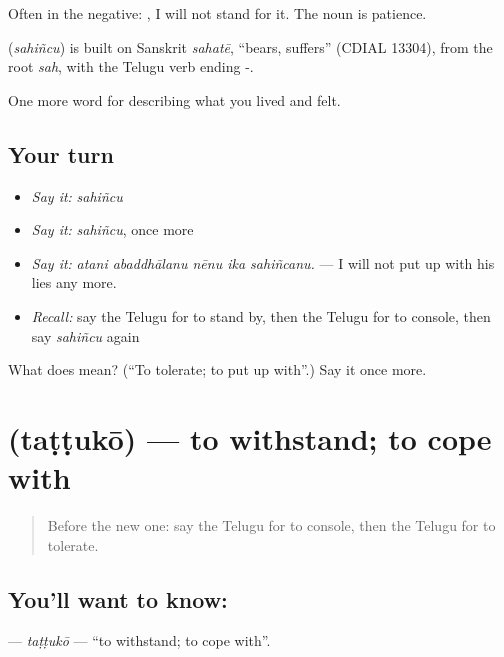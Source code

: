 Often in the negative: , I will not stand for it. The noun  is patience.

\begin{cousinweb}
\textbf{} (\emph{sahiñcu}) is built on Sanskrit \emph{sahatē}, \textquotedblleft{}bears, suffers\textquotedblright{} (CDIAL 13304), from the root \emph{sah}, with the Telugu verb ending -.
\end{cousinweb}

\begin{grammarlens}[title={What you've built}]
One more word for describing what you lived and felt.
\end{grammarlens}

\subsection*{Your turn}
\begin{itemize}
\raggedright
  \item \emph{Say it:} \emph{sahiñcu}
  \item \emph{Say it:} \emph{sahiñcu}, once more
  \item \emph{Say it:} \emph{atani abaddhālanu nēnu ika sahiñcanu.} — I will not put up with his lies any more.
  \item \emph{Recall:} say the Telugu for to stand by, then the Telugu for to console, then say \emph{sahiñcu} again
\end{itemize}

\begin{tcolorbox}[breakable,colback=teal!4,colframe=teal!35!black,title={Before you move on}]
What does  mean? (\textquotedblleft{}To tolerate; to put up with\textquotedblright{}.) Say it once more.
\end{tcolorbox}
\section[\texorpdfstring{\te{తట్టుకో} (taṭṭukō)}{తట్టుకో (taṭṭukō)}]{ (taṭṭukō) — to withstand; to cope with}

\label{lesson:TE-C506-tattuko}



\begin{quote}
Before the new one: say the Telugu for to console, then the Telugu for to tolerate.
\end{quote}

\subsection*{You'll want to know: }
\textbf{} — \emph{taṭṭukō} — \textquotedblleft{}to withstand; to cope with\textquotedblright{}.

